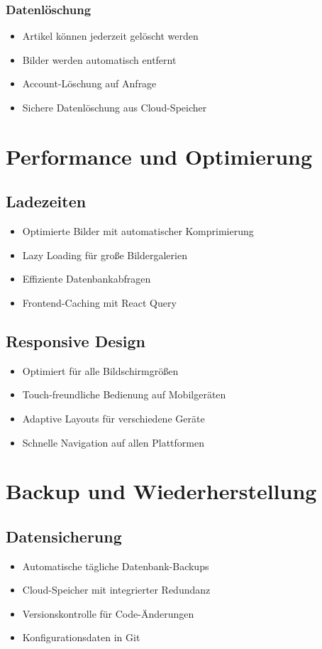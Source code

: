 \documentclass[a4paper,12pt]{article}
\begin{document}
\subsubsection{Datenlöschung}
\begin{itemize}
    \item Artikel können jederzeit gelöscht werden
    \item Bilder werden automatisch entfernt
    \item Account-Löschung auf Anfrage
    \item Sichere Datenlöschung aus Cloud-Speicher
\end{itemize}

\section{Performance und Optimierung}

\subsection{Ladezeiten}
\begin{itemize}
    \item Optimierte Bilder mit automatischer Komprimierung
    \item Lazy Loading für große Bildergalerien
    \item Effiziente Datenbankabfragen
    \item Frontend-Caching mit React Query
\end{itemize}

\subsection{Responsive Design}
\begin{itemize}
    \item Optimiert für alle Bildschirmgrößen
    \item Touch-freundliche Bedienung auf Mobilgeräten
    \item Adaptive Layouts für verschiedene Geräte
    \item Schnelle Navigation auf allen Plattformen
\end{itemize}

\section{Backup und Wiederherstellung}

\subsection{Datensicherung}
\begin{itemize}
    \item Automatische tägliche Datenbank-Backups
    \item Cloud-Speicher mit integrierter Redundanz
    \item Versionskontrolle für Code-Änderungen
    \item Konfigurationsdaten in Git
\end{itemize}
\end{document}
